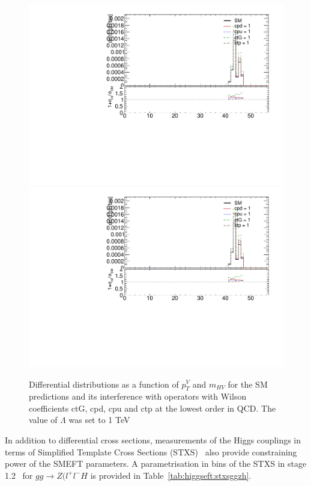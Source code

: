 \begin{figure}
\includegraphics[width=0.49\linewidth,page=7]{figures/kinematics_ggHll_np0.pdf}
\includegraphics[width=0.49\linewidth,page=10]{figures/kinematics_ggHll_np0.pdf}
\label{fig:higgseft:ggzh}
\caption{Differential distributions as a function of $p_{T}^{V}$ and $m_{HV}$ for the SM predictions and its interference with operators with Wilson coefficients ctG, cpd, cpu and ctp  at the lowest order in QCD. The value of $\Lambda$ was set to 1 TeV}  
\end{figure}

In addition to differential cross sections, measurements  of the Higgs couplings in terms of Simplified Template Cross Sections (STXS)~\cite{deFlorian:2016spz} also provide constraining power of the SMEFT parameters. A parametrisation in bins of the STXS in stage 1.2~\cite{Berger:2019wnu}  for $gg\to Z(l^{+}l^{-}H$  is provided in Table~\ref{tab:higgseft:stxsggzh}.


